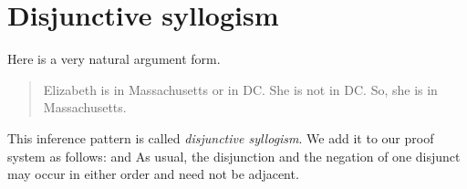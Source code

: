%

\section{Disjunctive syllogism}
Here is a very natural argument form.
	\begin{quote}
		Elizabeth is in Massachusetts or in DC. She is not in DC. So, she is in Massachusetts.
	\end{quote}
This inference pattern is called \emph{disjunctive syllogism}. We add it to our proof system as follows:
and
As usual, the disjunction and the negation of one disjunct may occur in either order and need not be adjacent.

